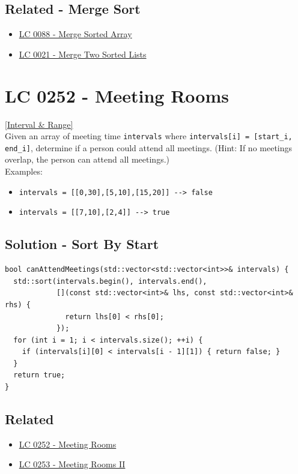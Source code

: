 \subsection*{Related - Merge Sort}
\begin{itemize}
	\item \hyperref[lc0088]{LC 0088 - Merge Sorted Array}
	\item \hyperref[lc0021]{LC 0021 - Merge Two Sorted Lists}
\end{itemize}

\section{LC 0252 - Meeting Rooms}\label{lc0252}
\hyperref[sec:interval_range]{[Interval \& Range]}\\

Given an array of meeting time {\colorbox{CodeBackground}{\lstinline|intervals|}} where {\colorbox{CodeBackground}{\lstinline|intervals[i] = [start_i, end_i]|}}, determine if a person could attend all meetings. (Hint: If no meetings overlap, the person can attend all meetings.) \\

Examples:
\begin{itemize}
\item {\colorbox{CodeBackground}{\lstinline|intervals = [[0,30],[5,10],[15,20]] --> false|}}
\item {\colorbox{CodeBackground}{\lstinline|intervals = [[7,10],[2,4]] --> true|}}
\end{itemize}

\subsection*{Solution - Sort By Start}
\begin{lstlisting}
bool canAttendMeetings(std::vector<std::vector<int>>& intervals) {
  std::sort(intervals.begin(), intervals.end(),
            [](const std::vector<int>& lhs, const std::vector<int>& rhs) {
              return lhs[0] < rhs[0];
            });
  for (int i = 1; i < intervals.size(); ++i) {
    if (intervals[i][0] < intervals[i - 1][1]) { return false; }
  }
  return true;
}
\end{lstlisting}

\subsection*{Related}
\begin{itemize}
\item \hyperref[lc0252]{LC 0252 - Meeting Rooms}
\item \hyperref[lc0253]{LC 0253 - Meeting Rooms II}
\end{itemize}

